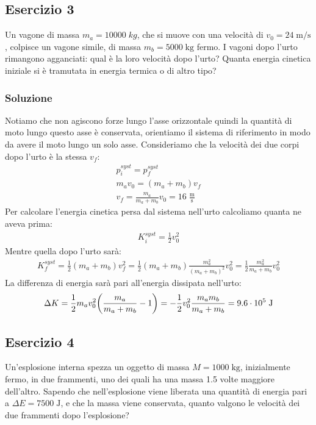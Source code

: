 \documentclass[12pt,a4paper]{book}
\begin{document}
\subsection*{Esercizio 3}
Un vagone di massa $m_a=10000 \; kg$, che si muove con una velocità di $v_0=24 \; \text{m}/\text{s}$, colpisce un vagone simile, di massa $m_b=5000 \; \text{kg}$ fermo. I vagoni dopo l'urto rimangono agganciati: qual è la loro velocità dopo l'urto? Quanta energia cinetica iniziale si è tramutata in energia termica o di altro tipo?


\subsubsection*{Soluzione}
Notiamo che non agiscono forze lungo l'asse orizzontale quindi la quantità di moto lungo questo asse è conservata, orientiamo il sistema di riferimento in modo da avere il moto lungo un solo asse. Consideriamo che la velocità dei due corpi dopo l'urto è la stessa $v_f$:
%
\begin{gather*}
p_i^{syst}=p_f^{syst} \\
m_av_0=(m_a+m_b)v_f \\
v_f=\frac{m_a}{m_a+m_b}v_0= 16 \; \frac{\text{m}}{\text{s}}
\end{gather*}
%
Per calcolare l'energia cinetica persa dal sistema nell'urto calcoliamo quanta ne aveva prima:
%
\begin{gather*}
K_i^{syst}=\frac{1}{2}v_0^2
\end{gather*}
%
Mentre quella dopo l'urto sarà:
%
\begin{gather*}
K_f^{syst}=\frac{1}{2}(m_a+m_b)v_f^2=\frac{1}{2}(m_a+m_b)\frac{m_a^2}{(m_a+m_b)^2}v_0^2=\frac{1}{2}\frac{m_a^2}{m_a+m_b}v_0^2
\end{gather*}
%
La differenza di energia sarà pari all'energia dissipata nell'urto:
%
\begin{gather*}
\Delta K = \frac{1}{2}m_av_0^2\qty(\frac{m_a}{m_a+m_b}-1)=-\frac{1}{2}v_0^2\frac{m_am_b}{m_a+m_b}=9.6 \cdot 10^5 \; \text{J}
\end{gather*}
%

\subsection*{Esercizio 4}
Un'esplosione interna spezza un oggetto di massa $M=1000 \; \text{kg}$, inizialmente fermo, in due frammenti, uno dei quali ha una massa 1.5 volte maggiore dell'altro. Sapendo che nell'esplosione viene liberata una quantità di energia pari a $\Delta E = 7500 \; \text{J}$, e che la massa viene conservata, quanto valgono le velocità dei due frammenti dopo l'esplosione?
\end{document}
